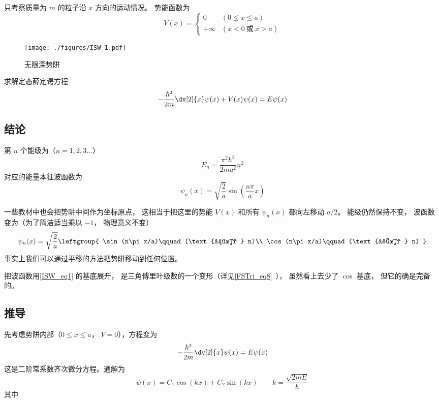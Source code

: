 

只考察质量为 $m$ 的粒子沿 $x$ 方向的运动情况。%
势能函数为
\begin{equation}
V(x) =
\begin{cases}
0 \quad &(0 \leqslant x \leqslant a)\\
+\infty  &(x < 0 \ \text{或}\  x > a)
\end{cases}
\end{equation}

\begin{figure}[ht]
\centering
\texttt{[image: ./figures/ISW\_1.pdf]}
\caption{无限深势阱} \label{ISW_fig1}
\end{figure}
求解定态薛定谔方程 %
\begin{equation}
-\frac{\hbar ^2}{2m} \dv[2]{x} \psi(x) + V(x)\psi(x) = E\psi(x)
\end{equation} 
\subsection{结论} 

第 $n$ 个能级为（$n = 1,2,3\dots$）
\begin{equation}
E_n = \frac{\pi^2 \hbar^2}{2m a^2} n^2
\end{equation}
对应的能量本征波函数为
\begin{equation}\label{ISW_eq1}
\psi_n(x) = \sqrt{\frac{2}{a}} \sin(\frac{n\pi }{a} x)
\end{equation}

一些教材中也会把势阱中间作为坐标原点， 这相当于把这里的势能 $V(x)$ 和所有 $\psi_n(x)$ 都向左移动 $a/2$。 能级仍然保持不变， 波函数变为（为了简洁适当乘以 $-1$， 物理意义不变）
\begin{equation}
\psi_n(x) = \sqrt{\frac{2}{a}}\leftgroup{
    \sin(n\pi x/a)\qquad (\text{偶数 } n)\\
    \cos(n\pi x/a)\qquad (\text{奇数 } n)
}
\end{equation}
事实上我们可以通过平移的方法把势阱移动到任何位置。

把波函数用\autoref{ISW_eq1} 的基底展开， 是三角傅里叶级数的一个变形（详见\autoref{FSTri_eq8}~）， 虽然看上去少了 $\cos$ 基底， 但它的确是完备的。

\subsection{推导} 
先考虑势阱内部（$0 \leqslant x \leqslant a$， $V = 0$），方程变为
\begin{equation}
-\frac{\hbar^2}{2m} \dv[2]{x} \psi(x) = E\psi(x) 
\end{equation}
这是二阶常系数齐次微分方程。通解为
\begin{equation}
\psi(x) = C_1\cos(kx) + C_2 \sin(kx) \qquad
k = \frac{\sqrt{2mE}}{\hbar}
\end{equation} 
其中


